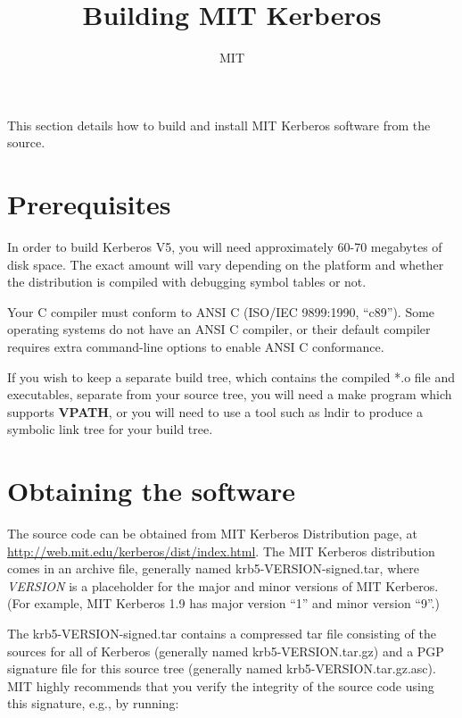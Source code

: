 \documentclass[letterpaper,10pt,english]{sphinxmanual}
\title{Building MIT Kerberos}
\date{ }
\author{MIT}
\begin{document}
\maketitle
\tableofcontents
{}\label{build/index::doc}


This section details how to build and install MIT Kerberos software
from the source.


\chapter{Prerequisites}
\label{build/index:building-kerberos-v5}\label{build/index:prerequisites}\label{build/index:build-v5}
In order to build Kerberos V5, you will need approximately 60-70
megabytes of disk space.  The exact amount will vary depending on the
platform and whether the distribution is compiled with debugging
symbol tables or not.

Your C compiler must conform to ANSI C (ISO/IEC 9899:1990, ``c89'').
Some operating systems do not have an ANSI C compiler, or their
default compiler requires extra command-line options to enable ANSI C
conformance.

If you wish to keep a separate build tree, which contains the compiled
*.o file and executables, separate from your source tree, you will
need a make program which supports \textbf{VPATH}, or you will need to use
a tool such as lndir to produce a symbolic link tree for your build
tree.


\chapter{Obtaining the software}
\label{build/index:obtaining-the-software}
The source code can be obtained from MIT Kerberos Distribution page,
at \href{http://web.mit.edu/kerberos/dist/index.html}{http://web.mit.edu/kerberos/dist/index.html}.
The MIT Kerberos distribution comes in an archive file, generally
named krb5-VERSION-signed.tar, where \emph{VERSION} is a placeholder for
the major and minor versions of MIT Kerberos.  (For example, MIT
Kerberos 1.9 has major version ``1'' and minor version ``9''.)

The krb5-VERSION-signed.tar contains a compressed tar file consisting
of the sources for all of Kerberos (generally named
krb5-VERSION.tar.gz) and a PGP signature file for this source tree
(generally named krb5-VERSION.tar.gz.asc).  MIT highly recommends that
you verify the integrity of the source code using this signature,
e.g., by running:
\end{document}
